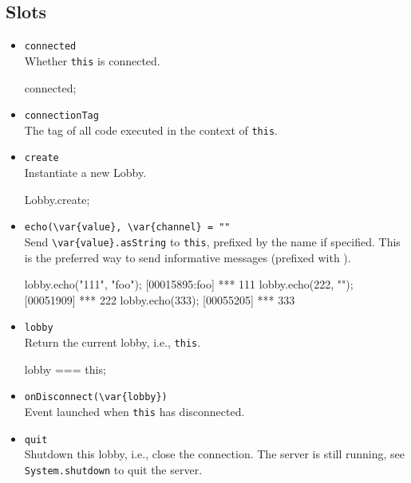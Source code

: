 \subsection{Slots}
\begin{itemize}
\item \lstinline|connected|\\
  Whether \lstinline|this| is connected.
\begin{urbiassert}[firstnumber=last]
connected;
\end{urbiassert}

\item \lstinline|connectionTag|\\
  The tag of all code executed in the context of \lstinline|this|.

\item \lstinline|create|\\
  Instantiate a new Lobby.
\begin{urbiassert}[firstnumber=last]
Lobby.create;
\end{urbiassert}

\item \lstinline|echo(\var{value}, \var{channel} = ""|\\
  Send \lstinline|\var{value}.asString| to \lstinline|this|, prefixed
  by the   name if specified.  This is
  the preferred way to send informative messages (prefixed with
  \samp{***}).
\begin{urbiscript}[firstnumber=last]
lobby.echo("111", "foo");
[00015895:foo] *** 111
lobby.echo(222, "");
[00051909] *** 222
lobby.echo(333);
[00055205] *** 333
\end{urbiscript}


\item \lstinline|lobby|\\
  Return the current lobby, i.e., \lstinline|this|.
\begin{urbiassert}[firstnumber=last]
lobby === this;
\end{urbiassert}

\item \lstinline|onDisconnect(\var{lobby})|\\
  Event launched when \lstinline|this| has disconnected.

\item \lstinline|quit|\\
  Shutdown this lobby, i.e., close the connection.  The server is
  still running, see \lstinline|System.shutdown| to quit the server.


\end{itemize}
